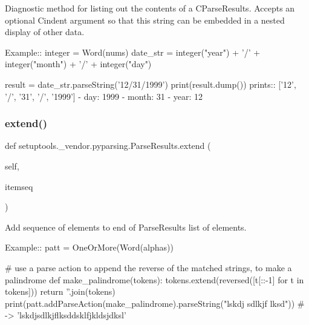 \begin{DoxyVerb}Diagnostic method for listing out the contents of a C{ParseResults}.
Accepts an optional C{indent} argument so that this string can be embedded
in a nested display of other data.

Example::
    integer = Word(nums)
    date_str = integer("year") + '/' + integer("month") + '/' + integer("day")
    
    result = date_str.parseString('12/31/1999')
    print(result.dump())
prints::
    ['12', '/', '31', '/', '1999']
    - day: 1999
    - month: 31
    - year: 12
\end{DoxyVerb}
 \mbox{\label{classsetuptools_1_1__vendor_1_1pyparsing_1_1ParseResults_a8963c59894060ca9d0dc2c906f8d57d9}} 
\subsubsection{\texorpdfstring{extend()}{extend()}}
{\footnotesize\ttfamily def setuptools.\+\_\+vendor.\+pyparsing.\+Parse\+Results.\+extend (\begin{DoxyParamCaption}\item[{}]{self,  }\item[{}]{itemseq }\end{DoxyParamCaption})}

\begin{DoxyVerb}Add sequence of elements to end of ParseResults list of elements.

Example::
    patt = OneOrMore(Word(alphas))
    
    # use a parse action to append the reverse of the matched strings, to make a palindrome
    def make_palindrome(tokens):
tokens.extend(reversed([t[::-1] for t in tokens]))
return ''.join(tokens)
    print(patt.addParseAction(make_palindrome).parseString("lskdj sdlkjf lksd")) # -> 'lskdjsdlkjflksddsklfjkldsjdksl'
\end{DoxyVerb}
 \mbox{\label{classsetuptools_1_1__vendor_1_1pyparsing_1_1ParseResults_a66c45d8a20af6e843c91db8054b7496f}} 
